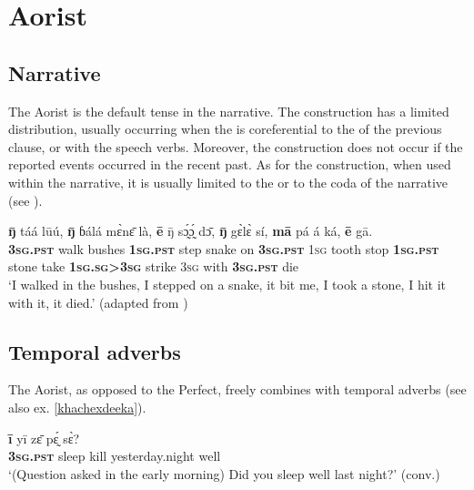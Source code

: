 \documentclass[output=paper]{LSP/langsci}
\begin{document}
\section{Aorist}
\label{khachsaorist}
\subsection{Narrative}
\label{khachnarr}

The Aorist is the default tense in the narrative. The  construction has a limited distribution, usually occurring when the  is coreferential to the  of the previous clause, or with the speech verbs. Moreover, the  construction does not occur if the reported events occurred in the recent past. As for the  construction, when used within the narrative, it is usually limited to the  or to the coda of the narrative (see ).  

\begin{exe}
\ex
\gll \textbf{ŋ̄} táá lūú, \textbf{ŋ̄} ɓálá mɛ̀nɛ̄ là, \textbf{ē} ŋ̄ sɔ̰́ɔ̰́ dɔ̄, \textbf{ŋ̄} gɛ̀lɛ̀ sí, \textbf{mā} pá á ká, \textbf{ē} gā. \\
\textbf{3\textsc{sg}.\textsc{pst}} walk bushes \textbf{1\textsc{sg}.\textsc{pst}} step snake on \textbf{3\textsc{sg}.\textsc{pst}} 1\textsc{sg} tooth stop \textbf{1\textsc{sg}.\textsc{pst}} stone take \textbf{1\textsc{sg}.\textsc{sg}>3\textsc{sg}} strike 3\textsc{sg} with \textbf{3\textsc{sg}.\textsc{pst}} die\\
\glt ‘I walked in the bushes, I stepped on a snake, it bit me, I took a stone, I hit it with it, it died.' (adapted from \citealt[801, ex. 8]{khachdahl2000})
\end{exe}

\subsection{Temporal adverbs}
\label{khachsectempadv}

The Aorist, as opposed to the Perfect, freely combines with temporal adverbs (see also ex. \ref{khachexdeeka}).

\begin{exe} \ex
\gll	\textbf{ī}	yī	zɛ̄	pɛ̰́	sɛ̀?	 \\	
	\textbf{3\textsc{sg}.\textsc{pst}}	sleep	kill	yesterday.night	well\\	
\glt ‘(Question asked in the early morning) Did you sleep well last night?’ (conv.)
\end{exe}
\end{document}
